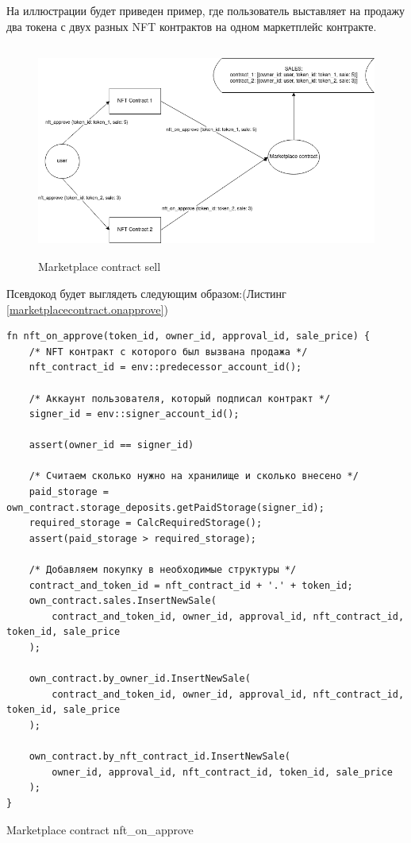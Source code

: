 На иллюстрации будет приведен пример, где пользователь выставляет на продажу два токена с двух разных NFT контрактов на одном маркетплейс контракте.

\begin{figure}[H]
	\centering
	\includegraphics[height=70mm]{fig/sell.png}
	\caption{Marketplace contract sell}
\end{figure}

Псевдокод будет выглядеть следующим образом:(Листинг {\color{blue}\ref{marketplacecontract.onapprove}})

\begin{listing}
\begin{verbatim}
fn nft_on_approve(token_id, owner_id, approval_id, sale_price) {
    /* NFT контракт с которого был вызвана продажа */
    nft_contract_id = env::predecessor_account_id();

    /* Аккаунт пользователя, который подписал контракт */
    signer_id = env::signer_account_id();

    assert(owner_id == signer_id)

    /* Считаем сколько нужно на хранилище и сколько внесено */
    paid_storage = own_contract.storage_deposits.getPaidStorage(signer_id);
    required_storage = CalcRequiredStorage();
    assert(paid_storage > required_storage);

    /* Добавляем покупку в необходимые структуры */
    contract_and_token_id = nft_contract_id + '.' + token_id;
    own_contract.sales.InsertNewSale(
        contract_and_token_id, owner_id, approval_id, nft_contract_id, token_id, sale_price
    );

    own_contract.by_owner_id.InsertNewSale(
        contract_and_token_id, owner_id, approval_id, nft_contract_id, token_id, sale_price
    );

    own_contract.by_nft_contract_id.InsertNewSale(
        owner_id, approval_id, nft_contract_id, token_id, sale_price
    );
}
\end{verbatim}
\caption{Marketplace contract nft\_on\_approve}
\label{marketplacecontract.onapprove}
\end{listing}

